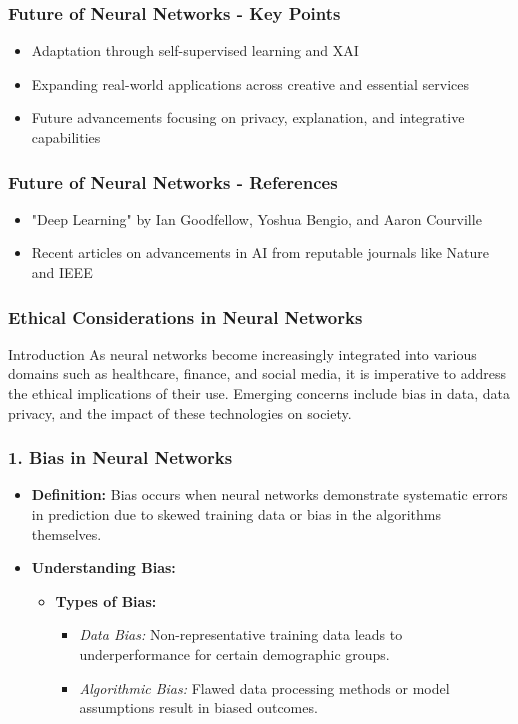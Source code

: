 \documentclass[aspectratio=169]{beamer}
\begin{document}
\begin{frame}[fragile]
    \frametitle{Future of Neural Networks - Key Points}
    \begin{itemize}
        \item Adaptation through self-supervised learning and XAI
        \item Expanding real-world applications across creative and essential services
        \item Future advancements focusing on privacy, explanation, and integrative capabilities
    \end{itemize}
\end{frame}

\begin{frame}[fragile]
    \frametitle{Future of Neural Networks - References}
    \begin{itemize}
        \item "Deep Learning" by Ian Goodfellow, Yoshua Bengio, and Aaron Courville
        \item Recent articles on advancements in AI from reputable journals like Nature and IEEE
    \end{itemize}
\end{frame}

\begin{frame}[fragile]
    \frametitle{Ethical Considerations in Neural Networks}
    \begin{block}{Introduction}
        As neural networks become increasingly integrated into various domains such as healthcare, finance, and social media, it is imperative to address the ethical implications of their use. Emerging concerns include bias in data, data privacy, and the impact of these technologies on society.
    \end{block}
\end{frame}

\begin{frame}[fragile]
    \frametitle{1. Bias in Neural Networks}
    \begin{itemize}
        \item \textbf{Definition:} Bias occurs when neural networks demonstrate systematic errors in prediction due to skewed training data or bias in the algorithms themselves.
        \item \textbf{Understanding Bias:}
        \begin{itemize}
            \item \textbf{Types of Bias:}
            \begin{itemize}
                \item \textit{Data Bias:} Non-representative training data leads to underperformance for certain demographic groups.
                \item \textit{Algorithmic Bias:} Flawed data processing methods or model assumptions result in biased outcomes.
            \end{itemize}
        \end{itemize}
    \end{itemize}
\end{frame}
\end{document}
